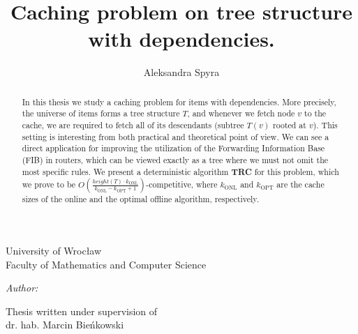\documentclass[a4paper,11pt]{article}
\title{Caching problem on tree structure with dependencies.}
\author{Aleksandra Spyra}
\makeatletter
\newcommand{\kind}[1]{\ensuremath{k_{\mathrm{#1}}}}
\newcommand{\linia}{\rule{\linewidth}{0.4mm}}
\renewcommand{\maketitle}{
\begin{titlepage}
    \vspace*{1cm}
    \begin{center}
        \small
        University of Wroc\l{}aw\\
        Faculty of Mathematics and Computer Science
    \end{center}
    \vspace{3cm}
    \noindent%
    \begin{center}
        \LARGE \textsc{\@title}
    \end{center}
    \vspace{1cm}
    \begin{center}
        \textit{\small Author:}\\
        \normalsize \textsc{\@author} \par
        \vspace{5cm}
    \end{center}
    \begin{flushright}    
        {\small Thesis written under supervision of}\\
             dr. hab. Marcin Bie\'{n}kowski
    \end{flushright}
    \vspace*{\stretch{6}}
    \begin{center}
        \@date
    \end{center}
\end{titlepage}
\setcounter{page}{2}
}
\makeatother
\begin{document}
\maketitle

\begin{abstract}
In this thesis we study a caching problem for items with dependencies.
More precisely, the universe of items forms a tree structure $T$, and whenever
we fetch node $v$ to the cache, we are required to fetch all of its descendants
(subtree $T(v)$ rooted at $v$). This setting is interesting from both practical 
and theoretical point of view. We can see a direct application for improving 
the utilization of the Forwarding Information Base (FIB) in routers, which can be 
viewed exactly as a tree where we must not omit the most specific rules. We 
present a deterministic algorithm \textbf{TRC} for this problem, which 
we 
prove to be $O(\frac{height(T) \cdot \kind{ONL}}{\kind{ONL} - \kind{OPT} + 1})$-competitive, 
where $\kind{ONL}$ and $\kind{OPT}$ are the cache sizes of the online and the optimal offline 
algorithm, respectively. 
\end{abstract}

\tableofcontents




\printbibliography[maxnames=10]
\end{document}
